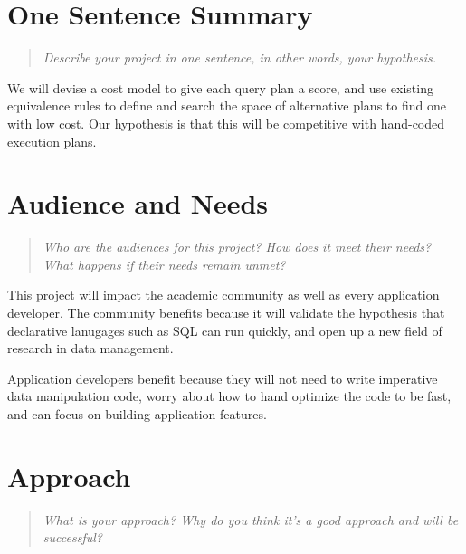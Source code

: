 \documentclass{proc}
\begin{document}
\section{One Sentence Summary}
\begin{quote}
\emph{Describe your project in one sentence, in other words, your hypothesis.}
\end{quote}

We will devise a cost model to give each query plan a score, and use existing equivalence rules to define and search the space of alternative plans to find one with low cost.  Our hypothesis is that this will be competitive with hand-coded execution plans.

\section{Audience and Needs}
\begin{quote}
\emph{Who are the audiences for this project? 
How does it meet their needs? 
What happens if their needs remain unmet?}
\end{quote}

This project will impact the academic community as well as every application developer.
The community benefits because it will validate the hypothesis that declarative lanugages such as SQL can run quickly, and open up a new field of research in data management.

Application developers benefit because they will not need to write imperative data manipulation code, worry about how to hand optimize the code to be fast, and can focus on building application features.

\section{Approach}
\begin{quote}
\emph{What is your approach?
Why do you think it's a good approach and will be successful?}
\end{quote}
\end{document}
